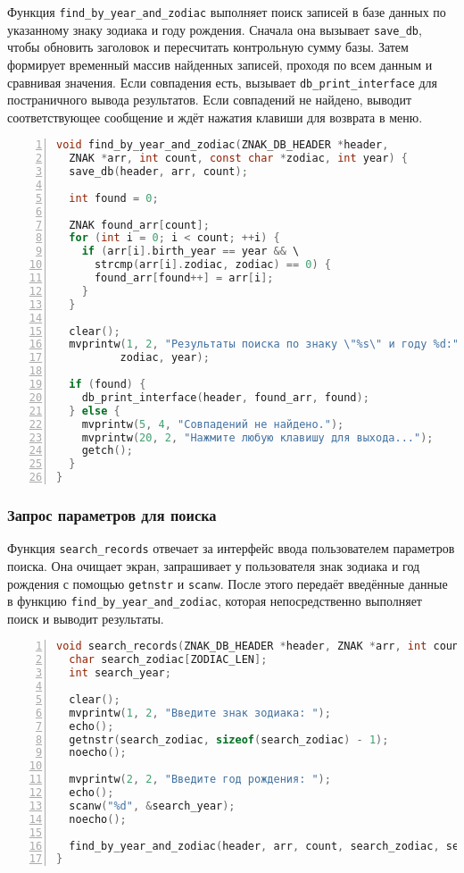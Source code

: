 Функция \texttt{find\_by\_year\_and\_zodiac} выполняет поиск записей в базе данных по указанному знаку зодиака и году рождения. Сначала она вызывает \texttt{save\_db}, чтобы обновить заголовок и пересчитать контрольную сумму базы. Затем формирует временный массив найденных записей, проходя по всем данным и сравнивая значения. Если совпадения есть, вызывает \texttt{db\_print\_interface} для постраничного вывода результатов. Если совпадений не найдено, выводит соответствующее сообщение и ждёт нажатия клавиши для возврата в меню.

\begin{lstlisting}[language=C, caption=Функция find\_by\_year\_and\_zodiac, numbers=left]
void find_by_year_and_zodiac(ZNAK_DB_HEADER *header, 
  ZNAK *arr, int count, const char *zodiac, int year) {
  save_db(header, arr, count);

  int found = 0;

  ZNAK found_arr[count];
  for (int i = 0; i < count; ++i) {
    if (arr[i].birth_year == year && \
      strcmp(arr[i].zodiac, zodiac) == 0) {
      found_arr[found++] = arr[i];
    }
  }
  
  clear();
  mvprintw(1, 2, "Результаты поиска по знаку \"%s\" и году %d:",
          zodiac, year);

  if (found) {
    db_print_interface(header, found_arr, found);
  } else {
    mvprintw(5, 4, "Совпадений не найдено.");
    mvprintw(20, 2, "Нажмите любую клавишу для выхода...");
    getch();
  }
}
\end{lstlisting}
\subsubsection*{Запрос параметров для поиска}

Функция \texttt{search\_records} отвечает за интерфейс ввода пользователем параметров поиска. Она очищает экран, запрашивает у пользователя знак зодиака и год рождения с помощью \texttt{getnstr} и \texttt{scanw}. После этого передаёт введённые данные в функцию \texttt{find\_by\_year\_and\_zodiac}, которая непосредственно выполняет поиск и выводит результаты.

\begin{lstlisting}[language=C, caption=Функция search\_records, numbers=left]
void search_records(ZNAK_DB_HEADER *header, ZNAK *arr, int count) {
  char search_zodiac[ZODIAC_LEN];
  int search_year;

  clear();
  mvprintw(1, 2, "Введите знак зодиака: ");
  echo();
  getnstr(search_zodiac, sizeof(search_zodiac) - 1);
  noecho();

  mvprintw(2, 2, "Введите год рождения: ");
  echo();
  scanw("%d", &search_year);
  noecho();

  find_by_year_and_zodiac(header, arr, count, search_zodiac, search_year);
}
\end{lstlisting}

